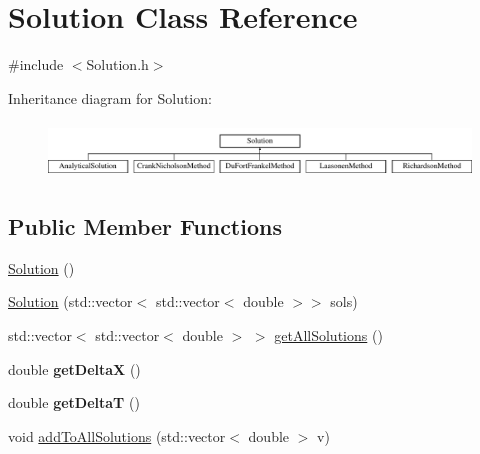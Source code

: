 \hypertarget{class_solution}{}\section{Solution Class Reference}
\label{class_solution}


{\ttfamily \#include $<$Solution.\+h$>$}

Inheritance diagram for Solution\+:\begin{figure}[H]
\begin{center}
\leavevmode
\includegraphics[height=1.473684cm]{class_solution}
\end{center}
\end{figure}
\subsection*{Public Member Functions}
\begin{DoxyCompactItemize}
\item 
\hyperlink{class_solution_ab55bd4b023d596ce11aaf737b9a6123b}{Solution} ()
\item 
\hyperlink{class_solution_acd2b9ac1b6ddd327ece034d99fc9cfdd}{Solution} (std\+::vector$<$ std\+::vector$<$ double $>$$>$ sols)
\item 
std\+::vector$<$ std\+::vector$<$ double $>$ $>$ \hyperlink{class_solution_abd28abd062adb793866fd5e1c8ef8639}{get\+All\+Solutions} ()
\item 
\mbox{\label{class_solution_a45756ea0f3bbd5a69e1ddcd12379f398}} 
double {\bfseries get\+DeltaX} ()
\item 
\mbox{\label{class_solution_ab5e6d31c8b567a20dce17b802242bd02}} 
double {\bfseries get\+DeltaT} ()
\item 
void \hyperlink{class_solution_a0ea58d9480ccb4e344c377f4861e1e7f}{add\+To\+All\+Solutions} (std\+::vector$<$ double $>$ v)
\end{DoxyCompactItemize}
